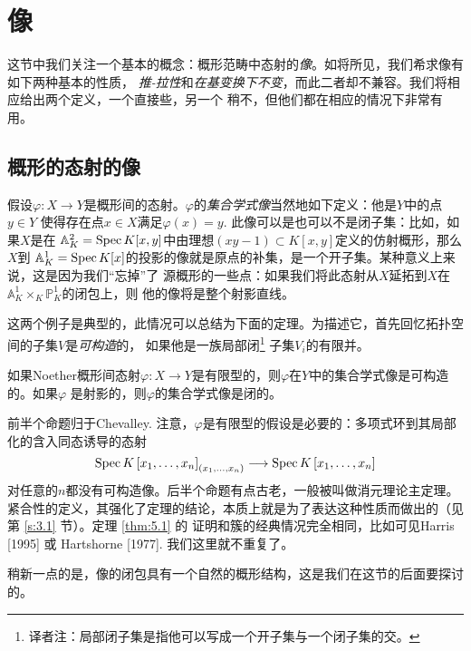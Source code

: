 \section{像}\label{s:5.1}


这节中我们关注一个基本的概念：概形范畴中态射的\textit{像}。如将所见，我们希求像有如下两种基本的性质，
\textit{推-拉性}和\textit{在基变换下不变}，而此二者却不兼容。我们将相应给出两个定义，一个直接些，另一个
稍不，但他们都在相应的情况下非常有用。

\subsection{概形的态射的像}\label{s:5.1.1}

假设$\varphi:X\to Y$是概形间的态射。$\varphi$的\textit{集合学式像}当然地如下定义：他是$Y$中的点$y\in Y$
使得存在点$x\in X$满足$\varphi(x)=y$. 此像可以是也可以不是闭子集：比如，如果$X$是在
$\mathbb{A}_K^2=\operatorname{Spec} K[x, y]$中由理想$(xy-1)\subset K[x,y]$定义的仿射概形，那么$X$到
$\mathbb{A}_K^1=\operatorname{Spec} K[x]$的投影的像就是原点的补集，是一个开子集。某种意义上来说，这是因为我们“忘掉”了
源概形的一些点：如果我们将此态射从$X$延拓到$X$在$\mathbb{A}_K^1 \times_K \mathbb{P}_K^1$的闭包上，则
他的像将是整个射影直线。

这两个例子是典型的，此情况可以总结为下面的定理。为描述它，首先回忆拓扑空间的子集$V$是\textit{可构造}的，
如果他是一族局部闭\footnote{译者注：局部闭子集是指他可以写成一个开子集与一个闭子集的交。}%
子集$V_i$的有限并。


\begin{thm}\label{thm:5.1}
    如果Noether概形间态射$\varphi: X\to Y$是有限型的，则$\varphi$在$Y$中的集合学式像是可构造的。如果$\varphi$
    是射影的，则$\varphi$的集合学式像是闭的。
\end{thm}

前半个命题归于Chevalley. 注意，$\varphi$是有限型的假设是必要的：多项式环到其局部化的含入同态诱导的态射
\[
    \operatorname{Spec} K\left[x_1, \ldots, x_n\right]_{\left(x_1, \ldots, x_n\right)} \longrightarrow 
    \operatorname{Spec} K\left[x_1, \ldots, x_n\right]
\]
对任意的$n$都没有可构造像。后半个命题有点古老，一般被叫做消元理论主定理。
紧合性的定义，其强化了定理的结论，本质上就是为了表达这种性质而做出的（见第 \ref{s:3.1} 节）。定理 \ref{thm:5.1} 的
证明和簇的经典情况完全相同，比如可见Harris [1995] 或 Hartshorne [1977]. 我们这里就不重复了。

稍新一点的是，像的闭包具有一个自然的概形结构，这是我们在这节的后面要探讨的。

